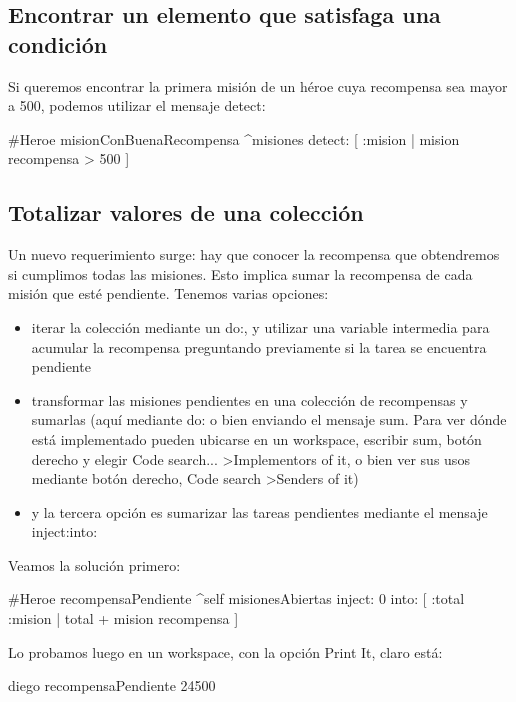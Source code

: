 \documentclass[a4paper,12pt]{book}
\begin{document}
\subsection{Encontrar un elemento que satisfaga una condición}
Si queremos encontrar la primera misión de un héroe cuya recompensa sea mayor a 500, 
podemos utilizar el mensaje detect:

\begin{code}
#Heroe
misionConBuenaRecompensa
    ^misiones detect: [ :mision | mision recompensa > 500 ]
\end{code}


\subsection{Totalizar valores de una colección}
Un nuevo requerimiento surge: hay que conocer la recompensa que obtendremos si cumplimos todas las misiones.
Esto implica sumar la recompensa de cada misión que esté pendiente. Tenemos varias opciones:
\\
\begin{itemize}
 \item iterar la colección mediante un do:, y utilizar una variable intermedia para acumular la recompensa
 preguntando previamente si la tarea se encuentra pendiente
 \item transformar las misiones pendientes en una colección de recompensas y sumarlas (aquí mediante do: o 
 bien enviando el mensaje sum. Para ver dónde está implementado pueden ubicarse en un workspace, escribir sum, 
 botón derecho y elegir Code search... \textgreater Implementors of it, o bien ver sus usos mediante botón derecho,
 Code search \textgreater Senders of it)
 \item y la tercera opción es sumarizar las tareas pendientes mediante el mensaje inject:into:
\end{itemize}

Veamos la solución primero:

\begin{code}
#Heroe
recompensaPendiente
   ^self misionesAbiertas 
         inject: 0 
	 into: [ :total :mision | total + mision recompensa ]
\end{code}

Lo probamos luego en un workspace, con la opción Print It, claro está:

\begin{code}
diego recompensaPendiente
  24500
\end{code}
\end{document}
